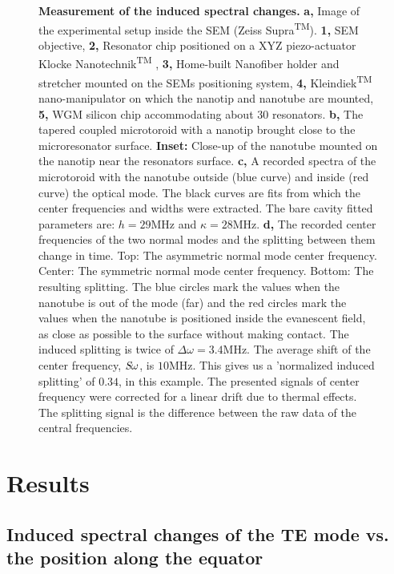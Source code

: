 \documentclass[journal=jacsat,manuscript=article]{achemso}
\begin{document}
\begin{figure}[H]
    \caption{\textbf{Measurement of the induced spectral changes.} \textbf{a,} Image of the experimental setup inside the SEM (Zeiss Supra\textsuperscript{TM}). \textbf{1,} SEM objective, \textbf{2,} Resonator chip positioned on a XYZ piezo-actuator Klocke Nanotechnik\textsuperscript{TM} , \textbf{3,} Home-built Nanofiber holder and stretcher mounted on the SEMs positioning system, \textbf{4,} Kleindiek\textsuperscript{TM} nano-manipulator on which the nanotip and nanotube are mounted, \textbf{5,} WGM silicon chip accommodating about 30 resonators. \textbf{b,} The tapered coupled microtoroid with a nanotip brought close to the microresonator surface. \textbf{Inset:} Close-up of the nanotube mounted on the nanotip near the resonators surface. \textbf{c,} A recorded spectra of the microtoroid with the nanotube outside (blue curve) and inside (red curve) the optical mode. The black curves are fits from which the center frequencies and widths were extracted. The bare cavity fitted parameters are: $h=29$MHz and $\kappa=28$MHz. \textbf{d,} The recorded center frequencies of the two normal modes and the splitting between them change in time. Top: The asymmetric normal mode center frequency. Center: The symmetric normal mode center frequency. Bottom: The resulting splitting. The blue circles mark the values when the nanotube is out of the mode (far) and the red circles mark the values when the nanotube is positioned inside the evanescent field, as close as possible to the surface without making contact. The induced splitting is twice of $\Delta \omega = 3.4$MHz. The average shift of the center frequency, $\textit S \omega$, is $10$MHz. This gives us a 'normalized induced splitting' of $0.34$, in this example. The presented signals of center frequency were corrected for a linear drift due to thermal effects. The splitting signal is the difference between the raw data of the central frequencies.
		\label{fig:experiment}}
\end{figure}

\section{Results}

\subsection{Induced spectral changes of the TE mode vs. the position along the equator}
\end{document}
